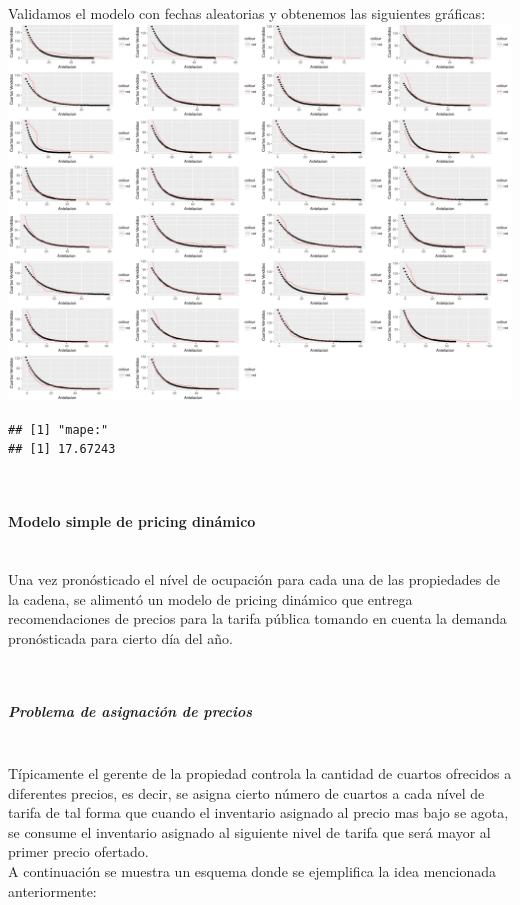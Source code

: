 \documentclass{article}\usepackage[]{graphicx}\usepackage[]{color}
\makeatletter
\def\maxwidth{ %
  \ifdim\Gin@nat@width>\linewidth
    \linewidth
  \else
    \Gin@nat@width
  \fi
}
\newenvironment{kframe}{%
 \def\at@end@of@kframe{}%
 \ifinner\ifhmode%
  \def\at@end@of@kframe{\end{minipage}}%
  \begin{minipage}{\columnwidth}%
 \fi\fi%
 \def\FrameCommand##1{\hskip\@totalleftmargin \hskip-\fboxsep
 \colorbox{shadecolor}{##1}\hskip-\fboxsep
     \hskip-\linewidth \hskip-\@totalleftmargin \hskip\columnwidth}%
 \MakeFramed {\advance\hsize-\width
   \@totalleftmargin\z@ \linewidth\hsize
   \@setminipage}}%
 {\par\unskip\endMakeFramed%
 \at@end@of@kframe}
\newenvironment{knitrout}{}{} %
\makeatother
\begin{document}
~\\
Validamos el modelo con fechas aleatorias y obtenemos las siguientes gráficas:
~\\
\begin{knitrout}
\color{fgcolor}
\includegraphics[width=\maxwidth]{figures/ValidacionModelo-1} 

\end{knitrout}

\begin{knitrout}
\color{fgcolor}\begin{kframe}


{\ttfamily\noindent\bfseries\color{errorcolor}{\#\# Error in detach(package:plyr): invalid 'name' argument}}\begin{verbatim}
## [1] "mape:"
## [1] 17.67243
\end{verbatim}
\end{kframe}
\end{knitrout}
~\\
\paragraph{Modelo simple de pricing dinámico}~\\
Una vez pronósticado el nível de ocupación para cada una de las propiedades de la cadena, se alimentó un modelo de pricing dinámico que entrega recomendaciones de precios para la tarifa pública tomando en cuenta la demanda pronósticada para cierto día del año.

~\\
\subparagraph{Problema de asignación de precios}~\\
Típicamente el gerente de la propiedad controla la cantidad de cuartos ofrecidos a diferentes precios, es decir, se asigna cierto número de cuartos a cada nível de tarifa de tal forma que cuando el inventario asignado al precio mas bajo se agota, se consume el inventario asignado al siguiente nivel de tarifa que será mayor al primer precio ofertado. 
~\\
A continuación se muestra un esquema donde se ejemplifica la idea mencionada anteriormente:
\end{document}
